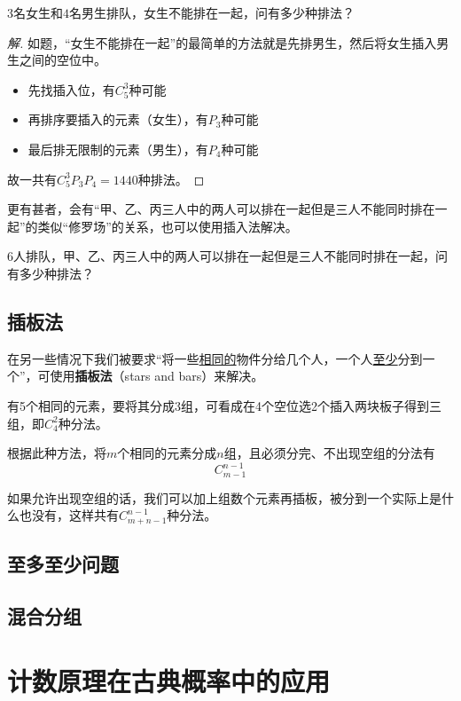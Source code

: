 \begin{example}
	$3$名女生和$4$名男生排队，女生不能排在一起，问有多少种排法？
\end{example}

\begin{proof}[解]
	如题，“女生不能排在一起”的最简单的方法就是先排男生，然后将女生插入男生之间的空位中。

	\begin{itemize}
		\item 先找插入位，有$C_5^3$种可能
		\item 再排序要插入的元素（女生），有$P_3$种可能
		\item 最后排无限制的元素（男生），有$P_4$种可能
	\end{itemize}

	故一共有$C_5^3P_3P_4=1440$种排法。
\end{proof}

更有甚者，会有“甲、乙、丙三人中的两人可以排在一起但是三人不能同时排在一起”的类似“修罗场”的关系，也可以使用插入法解决。

\begin{example}
	$6$人排队，甲、乙、丙三人中的两人可以排在一起但是三人不能同时排在一起，问有多少种排法？
\end{example}

\subsection{插板法}
在另一些情况下我们被要求“将一些\uline{相同的}物件分给几个人，一个人\uline{至少}分到一个”，可使用\textbf{插板法}（stars and bars）来解决。

有5个相同的元素，要将其分成3组，可看成在4个空位选2个插入两块板子得到三组，即$C_4^2$种分法。

根据此种方法，将$m$个相同的元素分成$n$组，且必须分完、不出现空组的分法有\[C_{m-1}^{n-1}\]

如果允许出现空组的话，我们可以加上组数个元素再插板，被分到一个实际上是什么也没有，这样共有$C_{m+n-1}^{n-1}$种分法。

\subsection{至多至少问题}

\subsection{混合分组}

\section[概率]{计数原理在古典概率中的应用}
